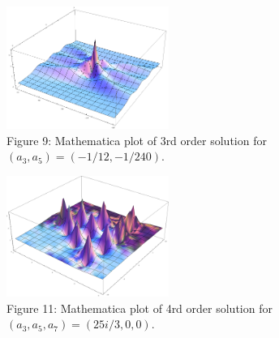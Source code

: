 \documentclass{beamer}
\theoremstyle{plain}
\theoremstyle{definition}
\begin{document}
\frame
{
\begin{figure}
\begin{center}
\includegraphics[width=200px]{3rd_order_max_peak.png}\\
Figure 9:  Mathematica plot of 3rd order solution for $(a_3,a_5)=(-1/12,-1/240)$.
\end{center}
\end{figure}
\vspace{-1mm}
}


\frame
{
\begin{figure}
\begin{center}
\includegraphics[width=200px]{4th_order_many_peaks.png}\\
Figure 11: Mathematica plot of 4rd order solution for $(a_3,a_5,a_7)=(25i/3,0,0)$.
\end{center}
\end{figure}
\vspace{-1mm}
}
\end{document}
